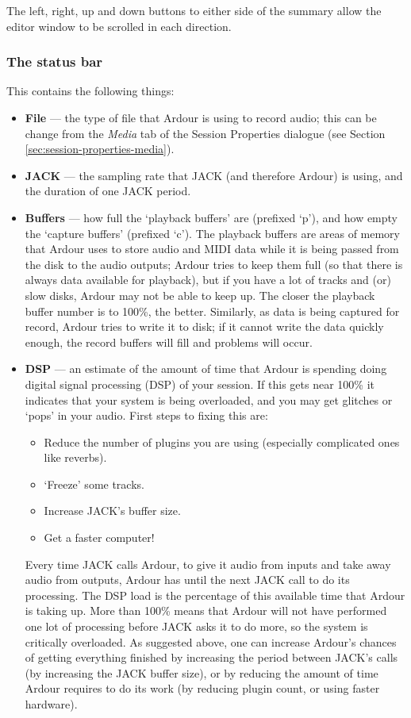 \documentclass[10pt,a4paper]{book}
\begin{document}
{The left, right, up and down buttons to either side of the summary
allow the editor window to be scrolled in each direction.

\subsubsection{The status bar}

This contains the following things:
\begin{itemize}
\item \textbf{File} --- the type of file that Ardour is using to record audio;
  this can be change from the \emph{Media} tab of the Session
  Properties dialogue (see Section
  \ref{sec:session-properties-media}).
\item \textbf{JACK} --- the sampling rate that JACK (and therefore Ardour) is
  using, and the duration of one JACK period.
\item \textbf{Buffers} --- how full the `playback buffers' are (prefixed `p'),
  and how empty the `capture buffers' (prefixed `c').  The playback
  buffers are areas of memory that Ardour uses to store audio and MIDI
  data while it is being passed from the disk to the audio outputs;
  Ardour tries to keep them full (so that there is always data
  available for playback), but if you have a lot of tracks and (or)
  slow disks, Ardour may not be able to keep up.  The closer the
  playback buffer number is to 100\%, the better.  Similarly, as data
  is being captured for record, Ardour tries to write it to disk; if
  it cannot write the data quickly enough, the record buffers will
  fill and problems will occur.
\item \textbf{DSP} --- an estimate of the amount of time that Ardour is
  spending doing digital signal processing (DSP) of your session.  If
  this gets near 100\% it indicates that your system is being
  overloaded, and you may get glitches or `pops' in your audio.  First
  steps to fixing this are:
\begin{itemize}
\item Reduce the number of plugins you are using (especially
  complicated ones like reverbs).
\item `Freeze' some tracks.
\item Increase JACK's buffer size.
\item Get a faster computer!
\end{itemize}

\begin{danger}
Every time JACK calls Ardour, to give it audio from inputs and take
away audio from outputs, Ardour has until the next JACK call to do its
processing.  The DSP load is the percentage of this available time
that Ardour is taking up.  More than 100\% means that Ardour will not
have performed one lot of processing before JACK asks it to do more,
so the system is critically overloaded.  As suggested above, one can
increase Ardour's chances of getting everything finished by increasing
the period between JACK's calls (by increasing the JACK buffer size),
or by reducing the amount of time Ardour requires to do its work (by
reducing plugin count, or using faster hardware).
\end{danger}


\end{itemize}}
\end{document}
